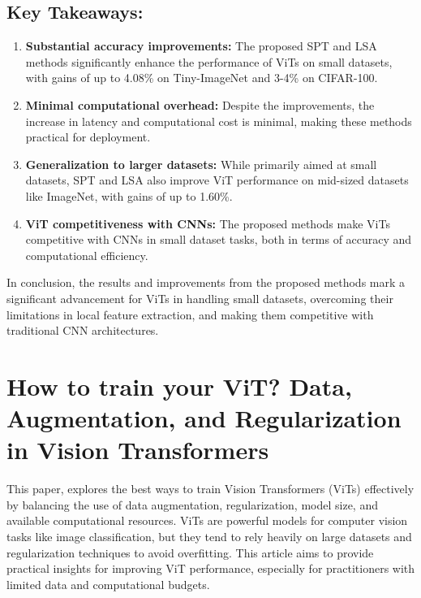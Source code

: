 \documentclass{report}
\begin{document}
	
	
	
	\section{Key Takeaways:}
	\begin{enumerate}
		\item 
		\textbf{Substantial accuracy improvements:} The proposed SPT and LSA methods significantly enhance the performance of ViTs on small datasets, with gains of up to 4.08\% on Tiny-ImageNet and 3-4\% on CIFAR-100.
		
		\item 
		\textbf{Minimal computational overhead:} Despite the improvements, the increase in latency and computational cost is minimal, making these methods practical for deployment.
		
		\item 
		\textbf{Generalization to larger datasets:} While primarily aimed at small datasets, SPT and LSA also improve ViT performance on mid-sized datasets like ImageNet, with gains of up to 1.60\%.
		
		\item 
		\textbf{ViT competitiveness with CNNs:} The proposed methods make ViTs competitive with CNNs in small dataset tasks, both in terms of accuracy and computational efficiency.
	\end{enumerate}
	
	In conclusion, the results and improvements from the proposed methods mark a significant advancement for ViTs in handling small datasets, overcoming their limitations in local feature extraction, and making them competitive with traditional CNN architectures.

	
	
	
	
	
	
	
	
	
	
	
	
	\chapter{How to train your ViT? Data, Augmentation,
		and Regularization in Vision Transformers \cite{DBLP:journals/corr/abs-2106-10270}}
		
		
	This paper, explores the best ways to train Vision Transformers (ViTs) effectively by balancing the use of data augmentation, regularization, model size, and available computational resources. ViTs are powerful models for computer vision tasks like image classification, but they tend to rely heavily on large datasets and regularization techniques to avoid overfitting. This article aims to provide practical insights for improving ViT performance, especially for practitioners with limited data and computational budgets.
	
\end{document}

